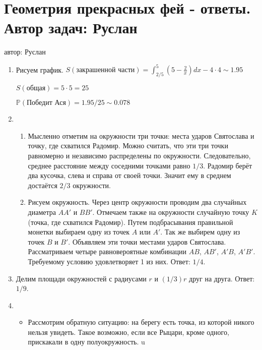 \documentclass[a4paper,12pt]{article}
\def \P{\mathbb{P}}
\begin{document}
\newpage
\section{Геометрия прекрасных фей - ответы. Автор задач: Руслан}
автор: Руслан

\begin{enumerate}
\item Рисуем график. $S(\text{закрашенной части}) = \int_{2/5}^{5}(5 - \frac{2}{x})dx - 4 \cdot 4 \sim 1.95$

$S(общая) = 5 \cdot 5 = 25$

$\P(\text{Победит Ася}) = 1.95 / 25 \sim 0.078 $
\item

\begin{enumerate}
  \item Мысленно отметим на окружности три точки: места ударов Святослава и точку,
  где схватился Радомир. Можно считать, что эти три точки равномерно
  и независимо распределены по окружности.
  Следовательно, среднее расстояние между соседними точками равно $1/3$.
  Радомир берёт два кусочка, слева и справа от своей точки.
  Значит ему в среднем достаётся $2/3$ окружности.
  \item  Рисуем окружность. Через центр окружности проводим два случайных диаметра $AA'$ и $BB'$. Отмечаем также на окружности случайную точку $K$ (точка, где схватился Радомир). Путем подбрасывания правильной монетки выбираем одну из точек $A$ или $A'$. Так же выбирем одну из точек $B$ и $B'$. Объявляем эти точки местами ударов Святослава. Рассматриваем четыре равновероятные комбинации $AB$, $AB'$, $A'B$, $A'B'$. Требуемому условию удовлетворяет 1 из них. Ответ: $1/4$.



  \end{enumerate}

\item Делим площади окружностей с радиусами $r$ и $ (1/3)r$ друг на друга. Ответ: $1/9$.
\item \begin{itemize}
    \item Рассмотрим обратную ситуацию: на берегу есть точка, из которой никого нельзя увидеть. Такое возможно, если все Рыцари, кроме одного, прискакали в одну полуокружность. u


\end{itemize}
\end{enumerate}
\end{document}
